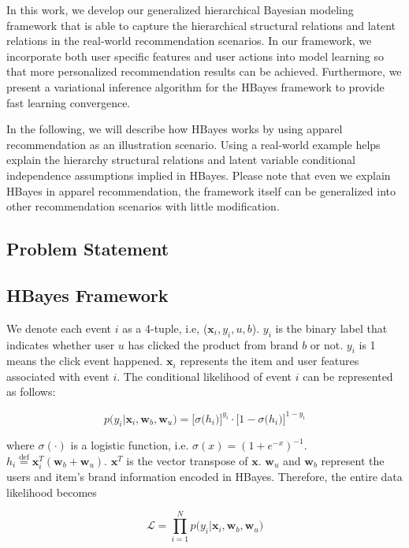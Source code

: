 In this work, we develop our generalized hierarchical Bayesian modeling framework that is able to capture the hierarchical structural relations and latent relations in the real-world recommendation scenarios. In our framework, we incorporate both user specific features and user actions into model learning so that more personalized recommendation results can be achieved. Furthermore, we present a variational inference algorithm for the HBayes framework to provide fast learning convergence.

In the following, we will describe how HBayes works by using apparel recommendation as an illustration scenario. Using a real-world example helps explain the hierarchy structural relations and latent variable conditional independence assumptions implied in HBayes. Please note that even we explain HBayes in apparel recommendation, the framework itself can be generalized into other recommendation scenarios with little modification. 

\subsection{Problem Statement}


\subsection{HBayes Framework}

We denote each event $i$ as a 4-tuple, i.e, ($\mathbf{x}_i, y_i, u, b$). $y_i$ is the binary label that indicates whether user $u$ has clicked the product from brand $b$ or not. $y_i$ is 1 means the click event happened. $\mathbf{x}_i$ represents the item and user features associated with event $i$. The conditional likelihood of event $i$ can be represented as follows:


\begin{equation}
p\big(y_i|\bm{x}_i,\bm{w}_b,\bm{w}_u \big)= \Big[\sigma\big(h_{i}\big)\Big]^{y_i} \cdot \Big[1-\sigma\big(h_{i}\big)\Big]^{1-y_i}
\end{equation}

\noindent where $\sigma(\cdot)$ is a logistic function, i.e. $\sigma(x)=(1+e^{-x})^{-1}$. $h_{i}\overset{\mathrm{def}}=\bm{x}_i^T(\bm{w}_b+\bm{w}_u)$. $\mathbf{x}^T$ is the vector transpose of $\mathbf{x}$. $\bm{w}_u$ and $\bm{w}_b$ represent the users and item's brand information encoded in HBayes. Therefore, the entire data likelihood becomes

\begin{equation}
\mathcal{L} = \prod_{i=1}^N p\big(y_i|\bm{x}_i,\bm{w}_b,\bm{w}_u \big)
\end{equation}



